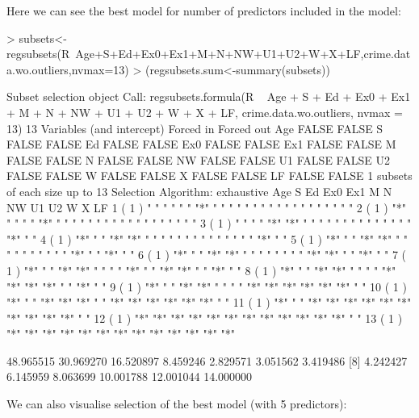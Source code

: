 \documentclass[a4paper]{article}
\begin{document}
\begin{itemize}
\begin{itemize}
\begin{itemize}
Here we can see the best model for number of predictors included in the
model: 
\begin{Schunk}
\begin{Sinput}
> subsets<-regsubsets(R~Age+S+Ed+Ex0+Ex1+M+N+NW+U1+U2+W+X+LF,crime.data.wo.outliers,nvmax=13)
> (regsubsets.sum<-summary(subsets))
\end{Sinput}
\begin{Soutput}
Subset selection object
Call: regsubsets.formula(R ~ Age + S + Ed + Ex0 + Ex1 + M + N + NW + 
    U1 + U2 + W + X + LF, crime.data.wo.outliers, nvmax = 13)
13 Variables  (and intercept)
    Forced in Forced out
Age     FALSE      FALSE
S       FALSE      FALSE
Ed      FALSE      FALSE
Ex0     FALSE      FALSE
Ex1     FALSE      FALSE
M       FALSE      FALSE
N       FALSE      FALSE
NW      FALSE      FALSE
U1      FALSE      FALSE
U2      FALSE      FALSE
W       FALSE      FALSE
X       FALSE      FALSE
LF      FALSE      FALSE
1 subsets of each size up to 13
Selection Algorithm: exhaustive
          Age S   Ed  Ex0 Ex1 M   N   NW  U1  U2  W   X   LF 
1  ( 1 )  " " " " " " "*" " " " " " " " " " " " " " " " " " "
2  ( 1 )  "*" " " " " "*" " " " " " " " " " " " " " " " " " "
3  ( 1 )  " " " " "*" "*" " " " " " " " " " " " " " " "*" " "
4  ( 1 )  "*" " " "*" "*" " " " " " " " " " " " " " " "*" " "
5  ( 1 )  "*" " " "*" "*" " " " " " " " " " " "*" " " "*" " "
6  ( 1 )  "*" " " "*" "*" " " " " " " " " "*" "*" " " "*" " "
7  ( 1 )  "*" " " "*" "*" " " " " "*" " " "*" "*" " " "*" " "
8  ( 1 )  "*" " " "*" "*" " " " " "*" "*" "*" "*" " " "*" " "
9  ( 1 )  "*" " " "*" "*" " " " " "*" "*" "*" "*" "*" "*" " "
10  ( 1 ) "*" " " "*" "*" "*" " " "*" "*" "*" "*" "*" "*" " "
11  ( 1 ) "*" " " "*" "*" "*" "*" "*" "*" "*" "*" "*" "*" " "
12  ( 1 ) "*" "*" "*" "*" "*" "*" "*" "*" "*" "*" "*" "*" " "
13  ( 1 ) "*" "*" "*" "*" "*" "*" "*" "*" "*" "*" "*" "*" "*"
\end{Soutput}
\begin{Soutput}
 [1] 48.965515 30.969270 16.520897  8.459246  2.829571  3.051562  3.419486
 [8]  4.242427  6.145959  8.063699 10.001788 12.001044 14.000000
\end{Soutput}
\end{Schunk}
We can also visualise selection of the best model (with 5 predictors):
\begin{figure}[H]
\begin{center}
\begin{Schunk}

\end{Schunk}
\end{center}
\end{figure}
\end{itemize}
\end{itemize}
\end{itemize}
\end{document}
